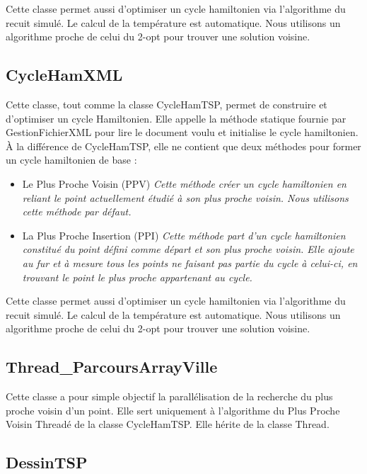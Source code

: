\documentclass{article}
\begin{document}
Cette classe permet aussi d'optimiser un cycle hamiltonien via l'algorithme du recuit simulé.
Le calcul de la température est automatique.
Nous utilisons un algorithme proche de celui du 2-opt pour trouver une solution voisine.

\subsection{CycleHamXML}

Cette classe, tout comme la classe CycleHamTSP, permet de construire et d'optimiser un cycle Hamiltonien.
Elle appelle la méthode statique fournie par GestionFichierXML pour lire le document voulu et initialise le cycle hamiltonien.
À la différence de CycleHamTSP, elle ne contient que deux méthodes pour former un cycle hamiltonien de base :

\begin{itemize}
\item Le Plus Proche Voisin (PPV) \emph{Cette méthode créer un cycle hamiltonien en reliant le point actuellement étudié à son plus proche voisin.
Nous utilisons cette méthode par défaut.}\smallskip

\item La Plus Proche Insertion (PPI) \emph{Cette méthode part d'un cycle hamiltonien constitué du point défini comme départ et son plus proche voisin.
Elle ajoute au fur et à mesure tous les points ne faisant pas partie du cycle à celui-ci, en trouvant le point le plus proche appartenant au cycle.}
\end{itemize}

Cette classe permet aussi d'optimiser un cycle hamiltonien via l'algorithme du recuit simulé.
Le calcul de la température est automatique.
Nous utilisons un algorithme proche de celui du 2-opt pour trouver une solution voisine.

\subsection{Thread\_ParcoursArrayVille}

Cette classe a pour simple objectif la parallélisation de la recherche du plus proche voisin d'un point.
Elle sert uniquement à l'algorithme du Plus Proche Voisin Threadé de la classe CycleHamTSP.
Elle hérite de la classe Thread.

\subsection{DessinTSP}
\end{document}
